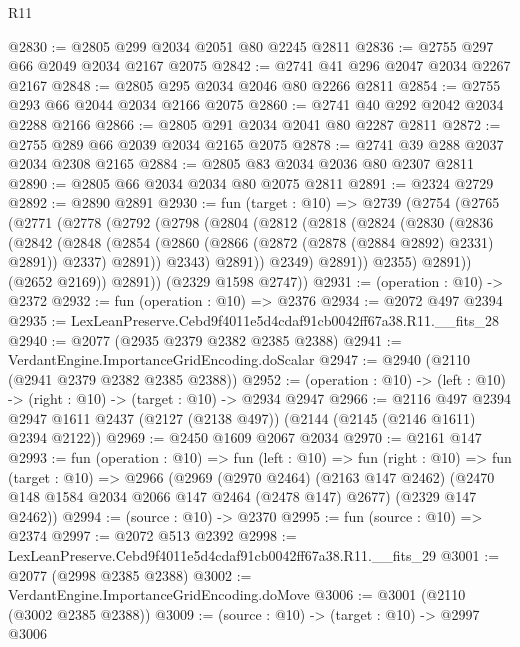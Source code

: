 \begin{lexlean}{R11}
\begin{coremodule}
@2830 := @2805 @299 @2034 @2051 @80 @2245 @2811
@2836 := @2755 @297 @66 @2049 @2034 @2167 @2075
@2842 := @2741 @41 @296 @2047 @2034 @2267 @2167
@2848 := @2805 @295 @2034 @2046 @80 @2266 @2811
@2854 := @2755 @293 @66 @2044 @2034 @2166 @2075
@2860 := @2741 @40 @292 @2042 @2034 @2288 @2166
@2866 := @2805 @291 @2034 @2041 @80 @2287 @2811
@2872 := @2755 @289 @66 @2039 @2034 @2165 @2075
@2878 := @2741 @39 @288 @2037 @2034 @2308 @2165
@2884 := @2805 @83 @2034 @2036 @80 @2307 @2811
@2890 := @2805 @66 @2034 @2034 @80 @2075 @2811
@2891 := @2324 @2729
@2892 := @2890 @2891
@2930 := fun (target : @10) =>
  @2739
    (@2754
      (@2765
        (@2771
          (@2778
            (@2792
              (@2798
                (@2804
                  (@2812
                    (@2818
                      (@2824
                        (@2830
                          (@2836
                            (@2842
                              (@2848
                                (@2854
                                  (@2860 (@2866 (@2872 (@2878 (@2884 @2892) @2331) @2891)) @2337)
                                  @2891))
                              @2343)
                            @2891))
                        @2349)
                      @2891))
                  @2355)
                @2891))
            (@2652 @2169))
          @2891))
      (@2329 @1598 @2747))
@2931 := (operation : @10) -> @2372
@2932 := fun (operation : @10) => @2376
@2934 := @2072 @497 @2394
@2935 := LexLeanPreserve.Cebd9f4011e5d4cdaf91cb0042ff67a38.R11.__fits_28
@2940 := @2077 (@2935 @2379 @2382 @2385 @2388)
@2941 := VerdantEngine.ImportanceGridEncoding.doScalar
@2947 := @2940 (@2110 (@2941 @2379 @2382 @2385 @2388))
@2952 := (operation : @10) -> (left : @10) -> (right : @10) -> (target : @10) -> @2934 @2947
@2966 := @2116
    @497
    @2394
    @2947
    @1611
    @2437
    (@2127 (@2138 @497))
    (@2144 (@2145 (@2146 @1611) @2394 @2122))
@2969 := @2450 @1609 @2067 @2034
@2970 := @2161 @147
@2993 := fun (operation : @10) =>
  fun (left : @10) =>
  fun (right : @10) =>
  fun (target : @10) =>
  @2966
    (@2969
      (@2970 @2464)
      (@2163 @147 @2462)
      (@2470 @148 @1584 @2034 @2066 @147 @2464 (@2478 @147) @2677)
      (@2329 @147 @2462))
@2994 := (source : @10) -> @2370
@2995 := fun (source : @10) => @2374
@2997 := @2072 @513 @2392
@2998 := LexLeanPreserve.Cebd9f4011e5d4cdaf91cb0042ff67a38.R11.__fits_29
@3001 := @2077 (@2998 @2385 @2388)
@3002 := VerdantEngine.ImportanceGridEncoding.doMove
@3006 := @3001 (@2110 (@3002 @2385 @2388))
@3009 := (source : @10) -> (target : @10) -> @2997 @3006

\end{coremodule}
\end{lexlean}
